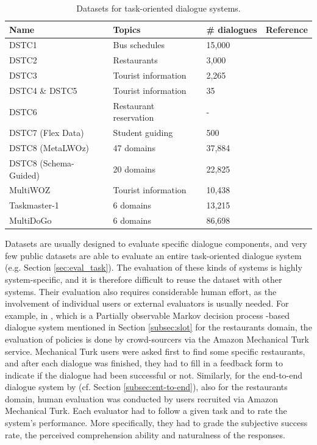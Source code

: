 \begin{table}[t]
\centering
\begin{tabular}{llll}
\hline
Name & Topics & \# dialogues   &  Reference\\ \hline
DSTC1 & Bus schedules & 15,000  &  \\
DSTC2 & Restaurants & 3,000 & \\
DSTC3 & Tourist information & 2,265 &  \\
DSTC4 \& DSTC5 & Tourist information & 35 & \\
DSTC6 & Restaurant reservation &-  & \\
DSTC7 (Flex Data) & Student guiding & 500 &  \\
DSTC8 (MetaLWOz)& 47 domains & 37,884  & \\
DSTC8 (Schema-Guided)& 20 domains&22,825&\\
MultiWOZ & Tourist information & 10,438  & \\
Taskmaster-1 & 6 domains & 13,215  &  \\
MultiDoGo & 6 domains & 86,698  &  \\
\hline
\end{tabular}
\caption{Datasets for task-oriented dialogue systems.}
\label{tab:task}
\end{table}
Datasets are usually designed to evaluate specific dialogue components, and very few public datasets are able to evaluate an entire task-oriented dialogue system (e.g. Section \ref{sec:eval_task}). The evaluation of these kinds of systems is highly system-specific, and it is therefore difficult to reuse the dataset with other systems. Their evaluation also requires considerable human effort, as  the involvement of individual users or external evaluators is usually needed. For example, in , which is a Partially observable Markov decision process -based dialogue system mentioned in Section \ref{subsec:slot} for the restaurants domain, the evaluation of policies is done by crowd-sourcers via the Amazon Mechanical Turk service. Mechanical Turk users were asked first to find some specific restaurants, and after each dialogue was finished, they had to fill in a feedback form to indicate if the dialogue had been successful or not. Similarly, for the end-to-end dialogue system by  (cf. Section \ref{subsec:ent-to-end}), also for the restaurants domain, human evaluation was conducted by users recruited via Amazon Mechanical Turk. Each evaluator had to follow a given task and to rate the system's performance. More specifically, they had to grade the subjective success rate, the perceived comprehension ability and naturalness of the responses. 
